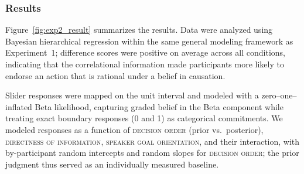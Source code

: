 \documentclass[10pt,letterpaper]{article}
\begin{document}
\subsubsection{Results}



Figure~\ref{fig:exp2_result} summarizes the results. Data were analyzed using Bayesian hierarchical regression within the same general modeling framework as Experiment~1; difference scores were positive on average across all conditions, indicating that the correlational information made participants more likely to endorse an action that is rational under a belief in causation.

Slider responses were mapped on the unit interval and modeled with a zero--one--inflated Beta likelihood, capturing graded belief in the Beta component while treating exact boundary responses (0 and 1) as categorical commitments. We modeled responses as a function of \textsc{decision order} (prior vs.\ posterior), \textsc{directness of information}, \textsc{speaker goal orientation}, and their interaction, with by-participant random intercepts and random slopes for \textsc{decision order}; the prior judgment thus served as an individually measured baseline.  

\end{document}
